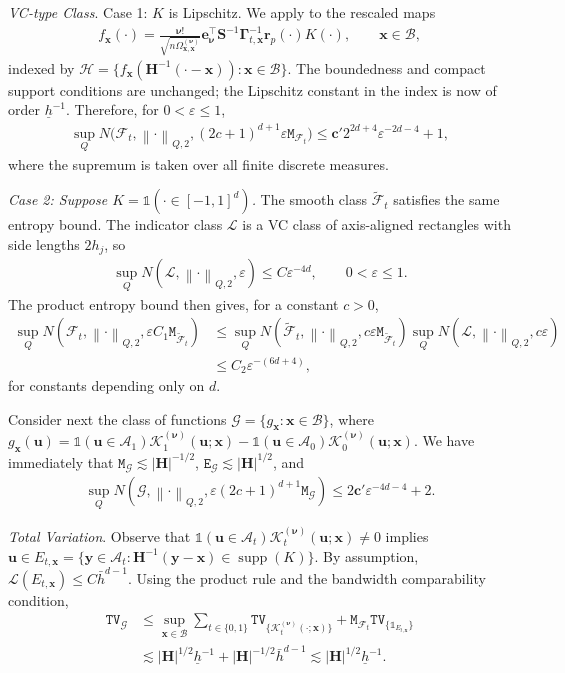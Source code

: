 \documentclass[10pt]{article}
\DeclareMathOperator{\supp}{supp}
\newcommand{\Indicator}{\mathds{1}}
\newcommand{\norm}[1]{\left\lVert#1\right\rVert}
\newcommand{\bc}{\mathbf{c}}
\newcommand{\be}{\mathbf{e}}
\newcommand{\bH}{\mathbf{H}}
\newcommand{\br}{\mathbf{r}}
\newcommand{\bS}{\mathbf{S}}
\newcommand{\bu}{\mathbf{u}}
\newcommand{\bx}{\mathbf{x}}
\newcommand{\by}{\mathbf{y}}
\newcommand{\bnu}{\boldsymbol{\nu}}
\newcommand{\bGamma}{\boldsymbol{\Gamma}}
\newcommand{\A}{\mathcal{A}}
\newcommand{\B}{\mathcal{B}}
\newcommand{\F}{\mathcal{F}}
\newcommand{\G}{\mathcal{G}}
\newcommand{\K}{\mathscr{K}}
\newcommand{\ttE}{\mathtt{E}}
\newcommand{\ttM}{\mathtt{M}}
\newcommand{\ttTV}{\mathtt{TV}}
\begin{document}
\medskip\textit{VC-type Class}. Case 1: $K$ is Lipschitz. We apply \citet[Lemma 7]{Cattaneo-Chandak-Jansson-Ma_2024_Bernoulli} to the rescaled maps
\begin{align*}
    f_{\bx}(\cdot)
    = \frac{\bnu!}{\sqrt{n \Omega_{\bx,\bx}^{(\bnu)}}}\be_{\bnu}^{\top} \bS^{-1} \bGamma_{t,\bx}^{-1} \br_p(\cdot)K(\cdot),
    \qquad \bx \in \B,
\end{align*}
indexed by $\mathcal{H}=\{f_{\bx}(\bH^{-1}(\cdot-\bx)):\bx\in\B\}$. The boundedness and compact support conditions are unchanged; the Lipschitz constant in the index is now of order $\underline h^{-1}$. Therefore, for $0<\varepsilon\leq1$,
\begin{align*}
    \sup_{Q} N\big(\F_t,\norm{\cdot}_{Q,2},(2c+1)^{d+1}\varepsilon\ttM_{\F_t}\big)
    \leq \bc'2^{2d+4}\varepsilon^{-2d-4}+1,
\end{align*}
where the supremum is taken over all finite discrete measures.

\emph{Case 2: Suppose $K=\Indicator(\cdot\in[-1,1]^d)$.} The smooth class $\tilde{\F}_t$ satisfies the same entropy bound. The indicator class $\mathscr{L}$ is a VC class of axis-aligned rectangles with side lengths $2h_j$, so
\begin{align*}
    \sup_Q N(\mathscr{L},\norm{\cdot}_{Q,2},\varepsilon)\leq C\varepsilon^{-4d},\qquad 0<\varepsilon\leq1.
\end{align*}
The product entropy bound then gives, for a constant $c>0$,
\begin{align*}
    \sup_Q N(\F_t,\norm{\cdot}_{Q,2},\varepsilon C_1\ttM_{\tilde{\F}_t})
    &\leq
    \sup_Q N(\tilde{\F}_t,\norm{\cdot}_{Q,2},c\varepsilon\ttM_{\tilde{\F}_t})
    \sup_Q N(\mathscr{L},\norm{\cdot}_{Q,2},c\varepsilon)\\
    &\leq C_2\varepsilon^{-(6d+4)},
\end{align*}
for constants depending only on $d$.

\bigskip
Consider next the class of functions $\G = \{g_{\bx}: \bx \in \B\}$, where $g_{\bx}(\bu)=\Indicator(\bu\in\A_1)\K_1^{(\bnu)}(\bu;\bx)-\Indicator(\bu\in\A_0)\K_0^{(\bnu)}(\bu;\bx)$. We have immediately that $\ttM_{\G}\lesssim|\bH|^{-1/2}$, $\ttE_{\G}\lesssim|\bH|^{1/2}$, and
\begin{align*}
    \sup_Q N(\G,\norm{\cdot}_{Q,2},\varepsilon(2c+1)^{d+1}\ttM_{\G})\leq 2\bc'\varepsilon^{-4d-4}+2.
\end{align*}

\medskip\textit{Total Variation}. Observe that $\Indicator(\bu\in\A_t)\K_t^{(\bnu)}(\bu;\bx)\neq0$ implies $\bu\in E_{t,\bx}=\{\by\in\A_t:\bH^{-1}(\by-\bx)\in\supp(K)\}$. By assumption, $\mathcal{L}(E_{t,\bx})\leq C\bar{h}^{d-1}$. Using the product rule and the bandwidth comparability condition,
\begin{align*}
    \ttTV_{\G}
    &\leq \sup_{\bx\in\B}\sum_{t\in\{0,1\}}\ttTV_{\{\K_t^{(\bnu)}(\cdot;\bx)\}}+\ttM_{\F_t}\ttTV_{\{\Indicator_{E_{t,\bx}}\}}\\
    &\lesssim |\bH|^{1/2}\underline h^{-1}+|\bH|^{-1/2}\bar{h}^{d-1}
    \lesssim |\bH|^{1/2}\underline h^{-1}.
\end{align*}
\end{document}
